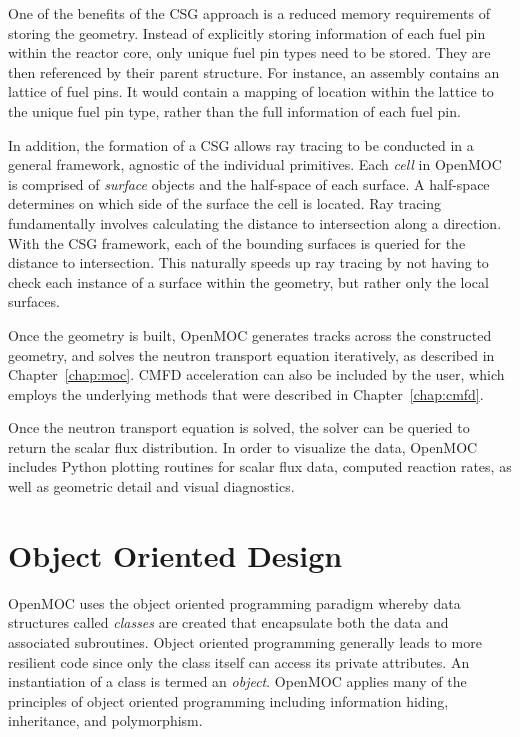 One of the benefits of the CSG approach is a reduced memory requirements of storing the geometry. Instead of explicitly storing information of each fuel pin within the reactor core, only unique fuel pin types need to be stored. They are then referenced by their parent structure. For instance, an assembly contains an lattice of fuel pins. It would contain a mapping of location within the lattice to the unique fuel pin type, rather than the full information of each fuel pin.

In addition, the formation of a CSG allows ray tracing to be conducted in a general framework, agnostic of the individual primitives. Each \textit{cell} in OpenMOC is comprised of \textit{surface} objects and the half-space of each surface. A half-space determines on which side of the surface the cell is located. Ray tracing fundamentally involves calculating the distance to intersection along a direction. With the CSG framework, each of the bounding surfaces is queried for the distance to intersection. This naturally speeds up ray tracing by not having to check each instance of a surface within the geometry, but rather only the local surfaces. 

Once the geometry is built, OpenMOC generates tracks across the constructed geometry, and solves the neutron transport equation iteratively, as described in Chapter~\ref{chap:moc}. CMFD acceleration can also be included by the user, which employs the underlying methods that were described in Chapter~\ref{chap:cmfd}.

Once the neutron transport equation is solved, the solver can be queried to return the scalar flux distribution. In order to visualize the data, OpenMOC includes Python plotting routines for scalar flux data, computed reaction rates, as well as geometric detail and visual diagnostics. 


\section{Object Oriented Design}
\label{sec:object-oriented}

OpenMOC uses the object oriented programming paradigm whereby data structures called \textit{classes} are created that encapsulate both the data and associated subroutines. Object oriented programming generally leads to more resilient code since only the class itself can access its private attributes. An instantiation of a class is termed an \textit{object}. OpenMOC applies many of the principles of object oriented programming including information hiding, inheritance, and polymorphism.


